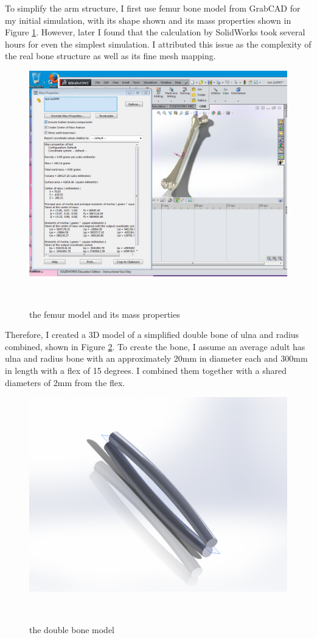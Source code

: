 \documentclass{sigchi}
\begin{document}
To simplify the arm structure, I first use femur bone model from GrabCAD \cite{SB:bone} for my initial simulation, with its shape shown and its mass properties shown in Figure \ref{fig:femur_property}. However, later I found that the calculation by SolidWorks took several hours for even the simplest simulation. I attributed this issue as the complexity of the real bone structure as well as its fine mesh mapping. 


\begin{figure}
\centering
  \includegraphics[width=0.9\columnwidth]{figures/femur_property}
  \caption{the femur model and its mass properties }~\label{fig:femur_property}
\end{figure}


Therefore, I created a 3D model of a simplified double bone of ulna and radius combined, shown in Figure \ref{fig:double_bone}. To create the bone, I assume an average adult has ulna and radius bone with an approximately 20mm in diameter each and 300mm in length with a flex of 15 degrees. I combined them together with a shared diameters of 2mm from the flex. 


\begin{figure}
\centering
  \includegraphics[width=0.9\columnwidth]{figures/double_bone}
  \caption{the double bone model}~\label{fig:double_bone}
\end{figure}
\end{document}
